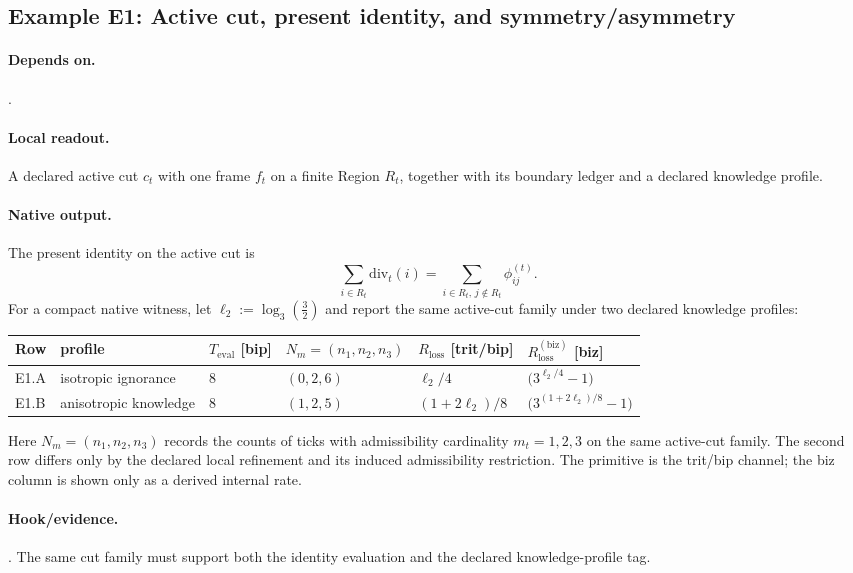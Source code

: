 \subsection{Example E1: Active cut, present identity, and symmetry/asymmetry}
\paragraph{Depends on.} .
\paragraph{Local readout.} A declared active cut $c_t$ with one frame $f_t$ on a finite Region $R_t$, together with its boundary ledger and a declared knowledge profile.
\paragraph{Native output.} The present identity on the active cut is
\[
\sum_{i\in R_t}\mathrm{div}_t(i)=\sum_{i\in R_t,\,j\notin R_t}\phi^{(t)}_{ij}.
\]
For a compact native witness, let $\ell_2:=\log_3\!\left(\frac{3}{2}\right)$ and report the same active-cut family under two declared knowledge profiles:
\begin{center}
\begin{tabular}{@{}llllll@{}}
\toprule
Row & profile & $T_{\mathrm{eval}}$ [bip] & $N_m=(n_1,n_2,n_3)$ & $R_{\mathrm{loss}}$ [trit/bip] & $R_{\mathrm{loss}}^{(\mathrm{biz})}$ [biz] \\
\midrule
E1.A & isotropic ignorance & $8$ & $(0,2,6)$ & $\ell_2/4$ & $\bigl(3^{\ell_2/4}-1\bigr)$ \\
E1.B & anisotropic knowledge & $8$ & $(1,2,5)$ & $(1+2\ell_2)/8$ & $\bigl(3^{(1+2\ell_2)/8}-1\bigr)$ \\
\bottomrule
\end{tabular}
\end{center}
Here $N_m=(n_1,n_2,n_3)$ records the counts of ticks with admissibility cardinality $m_t=1,2,3$ on the same active-cut family. The second row differs only by the declared local refinement and its induced admissibility restriction. The primitive is the trit/bip channel; the biz column is shown only as a derived internal rate.
\paragraph{Hook/evidence.} . The same cut family must support both the identity evaluation and the declared knowledge-profile tag.
